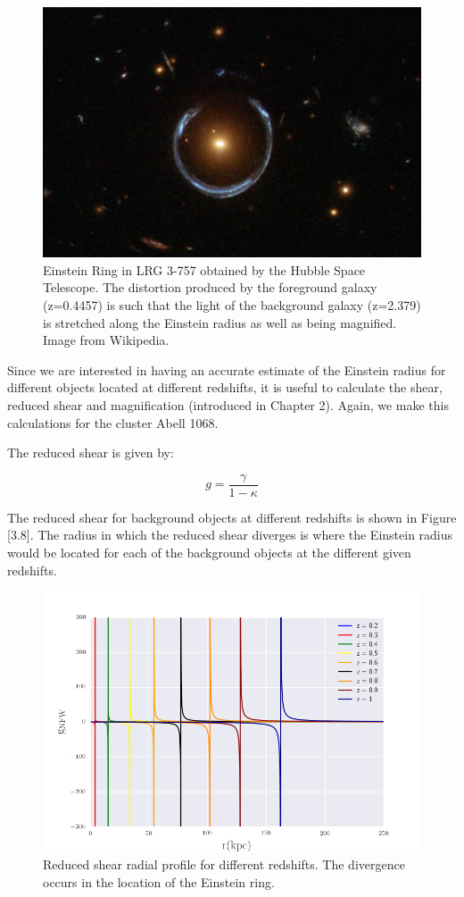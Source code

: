 \begin{figure}[H]
\centering
\includegraphics[width=12cm]{images/einstein_ring_wiki.jpg}
\caption[Einstein Ring in LRG 3-757]{Einstein Ring in LRG 3-757 obtained by the Hubble Space Telescope. The distortion produced by the foreground galaxy (z=0.4457) is such that the light of the background galaxy (z=2.379) is stretched along the Einstein radius as well as being magnified. Image from Wikipedia.}
\end{figure}

Since we are interested in having an accurate estimate of the Einstein radius for different objects located at different redshifts, it is useful to calculate the shear, reduced shear and magnification (introduced in Chapter 2). Again, we make this calculations for the cluster Abell 1068.

The reduced shear is given by:

\begin{equation}
g=\frac{\gamma}{1-\kappa}
\end{equation}

The reduced shear for background objects at different redshifts is shown in Figure [3.8]. The radius in which the reduced shear diverges is where the Einstein radius would be located for each of the background objects at the different given redshifts. 

\begin{figure}[H]
\centering
\includegraphics[width=12cm]{images/Reduced_Shear.png}
\caption[Reduced shear radial]{Reduced shear radial profile for different redshifts. The divergence occurs in the location of the Einstein ring.}
\end{figure}

